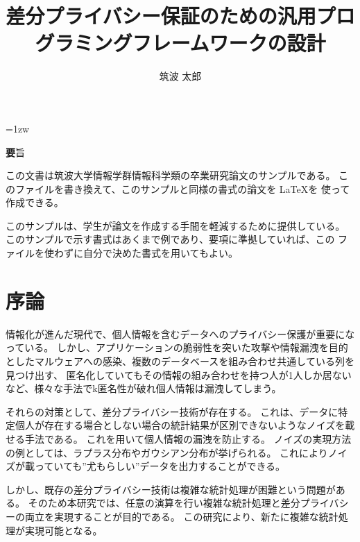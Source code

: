 \documentclass[a4paper,11pt]{jreport}
\title{差分プライバシー保証のための汎用プログラミングフレームワークの設計}
\author{筑波 太郎}
\begin{document}
\maketitle
\thispagestyle{empty}
\newpage

\thispagestyle{empty}
\vspace*{20pt plus 1fil}
\parindent=1zw
\noindent
\begin{center}
{\Large \textbf 要旨}
\vspace{2cm}
\end{center}
この文書は筑波大学情報学群情報科学類の卒業研究論文のサンプルである。
このファイルを書き換えて、このサンプルと同様の書式の論文を \LaTeX を
使って作成できる。

このサンプルは、学生が論文を作成する手間を軽減するために提供している。
このサンプルで示す書式はあくまで例であり、要項に準拠していれば、この
ファイルを使わずに自分で決めた書式を用いてもよい。

\par
\vspace{0pt plus 1fil}
\newpage

\tableofcontents
\listoffigures

\pagebreak \setcounter{page}{1}

\chapter{序論}

情報化が進んだ現代で、個人情報を含むデータへのプライバシー保護が重要になっている。
しかし、アプリケーションの脆弱性を突いた攻撃や情報漏洩を目的としたマルウェアへの感染、複数のデータベースを組み合わせ共通している列を見つけ出す、
匿名化していてもその情報の組み合わせを持つ人が1人しか居ないなど、様々な手法でk匿名性が破れ個人情報は漏洩してしまう。

それらの対策として、差分プライバシー技術が存在する。
これは、データに特定個人が存在する場合としない場合の統計結果が区別できないようなノイズを載せる手法である。
これを用いて個人情報の漏洩を防止する。
ノイズの実現方法の例としては、ラプラス分布やガウシアン分布が挙げられる。
これによりノイズが載っていても”尤もらしい”データを出力することができる。

しかし、既存の差分プライバシー技術は複雑な統計処理が困難という問題がある。
そのため本研究では、任意の演算を行い複雑な統計処理と差分プライバシーの両立を実現することが目的である。
この研究により、新たに複雑な統計処理が実現可能となる。
\end{document}
